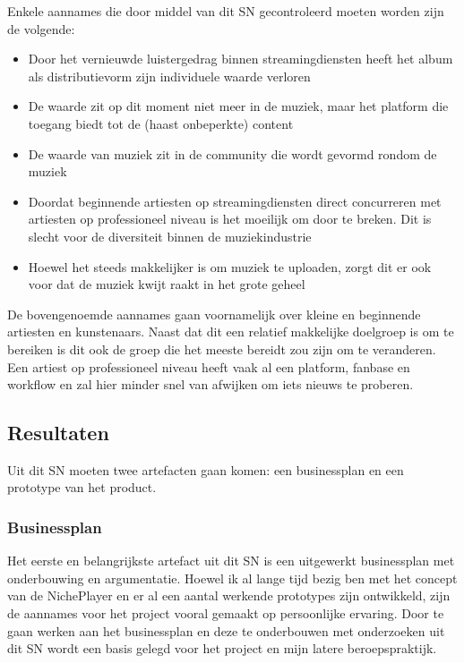 Enkele aannames die door middel van dit SN gecontroleerd moeten worden zijn de volgende:

\begin{itemize}
    \item Door het vernieuwde luistergedrag binnen streamingdiensten heeft het album als distributievorm zijn individuele waarde verloren
    \item De waarde zit op dit moment niet meer in de muziek, maar het platform die toegang biedt tot de (haast onbeperkte) content
    \item De waarde van muziek zit in de community die wordt gevormd rondom de muziek
    \item Doordat beginnende artiesten op streamingdiensten direct concurreren met artiesten op professioneel niveau is het moeilijk om door te breken. Dit is slecht voor de diversiteit binnen de muziekindustrie
    \item Hoewel het steeds makkelijker is om muziek te uploaden, zorgt dit er ook voor dat de muziek kwijt raakt in het grote geheel
\end{itemize}

De bovengenoemde aannames gaan voornamelijk over kleine en beginnende artiesten en kunstenaars. Naast dat dit een relatief makkelijke doelgroep is om te bereiken is dit ook de groep die het meeste bereidt zou zijn om te veranderen. Een artiest op professioneel niveau heeft vaak al een platform, fanbase en workflow en zal hier minder snel van afwijken om iets nieuws te proberen.

\subsection{Resultaten}
Uit dit SN moeten twee artefacten gaan komen: een businessplan en een prototype van het product.

\subsubsection*{Businessplan}
Het eerste en belangrijkste artefact uit dit SN is een uitgewerkt businessplan met onderbouwing en argumentatie. Hoewel ik al lange tijd bezig ben met het concept van de NichePlayer en er al een aantal werkende prototypes zijn ontwikkeld, zijn de aannames voor het project vooral gemaakt op persoonlijke ervaring. Door te gaan werken aan het businessplan en deze te onderbouwen met onderzoeken uit dit SN wordt een basis gelegd voor het project en mijn latere beroepspraktijk.

